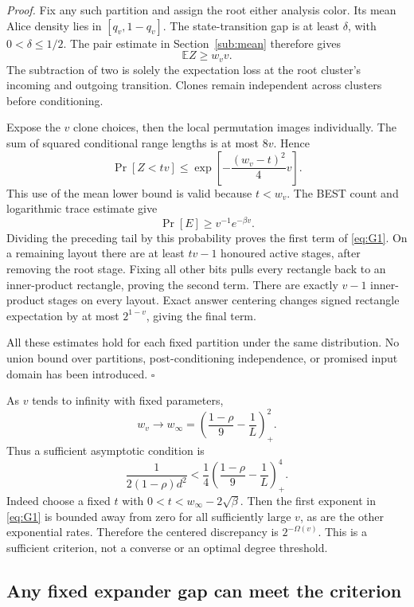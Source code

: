 \documentclass[11pt]{article}
\theoremstyle{definition}
\theoremstyle{remark}
\numberwithin{equation}{section}
\begin{document}
\emph{Proof.} Fix any such partition and assign the root either
analysis color. Its mean Alice density lies in
\([q_v,1-q_v]\). The state-transition gap is at least
\(\delta\), with \(0<\delta\le1/2\). The pair estimate in Section~\ref{sub:mean}
therefore gives
\[
                         \mathbb E Z\ge w_v v.
\]
The subtraction of two is solely the expectation loss at
the root cluster's incoming and outgoing transition.
Clones remain independent across clusters before conditioning.

Expose the \(v\) clone choices, then the local permutation
images individually. The sum of squared conditional range
lengths is at most \(8v\). Hence
\[
 \Pr[Z<tv]\le
       \exp\!\left[-\frac{(w_v-t)^2}{4}v\right].
\]
This use of the mean lower bound is valid because \(t<w_v\).
The BEST count and logarithmic trace estimate give
\[
                   \Pr[E]\ge v^{-1}e^{-\beta v}.
\]
Dividing the preceding tail by this probability proves
the first term of \eqref{eq:G1}. On a remaining layout there are
at least \(tv-1\) honoured active stages, after removing
the root stage. Fixing all other bits pulls every rectangle
back to an inner-product rectangle, proving the second term.
There are exactly \(v-1\) inner-product stages on every
layout. Exact answer centering changes signed rectangle
expectation by at most \(2^{1-v}\), giving the final term.

All these estimates hold for each fixed partition under
the same distribution. No union bound over partitions,
post-conditioning independence, or promised input domain
has been introduced. \(\square\)

As \(v\) tends to infinity with fixed parameters,
\[
            w_v\longrightarrow
            w_\infty=
             \left(\frac{1-\rho}{9}-\frac1L\right)_+^2.
\]
Thus a sufficient asymptotic condition is
\begin{equation}\label{eq:G2}
\boxed{\qquad
       \frac1{2(1-\rho)d^2}
         <\frac14
            \left(\frac{1-\rho}{9}-\frac1L\right)_+^4 .
       \qquad}
\end{equation}
Indeed choose a fixed \(t\) with
\(0<t<w_\infty-2\sqrt\beta\). Then the first exponent
in \eqref{eq:G1} is bounded away from zero for all sufficiently
large \(v\), as are the other exponential rates. Therefore
the centered discrepancy is \(2^{-\Omega(v)}\).
This is a sufficient criterion, not a converse or an optimal
degree threshold.

\subsection{Any fixed expander gap can meet the criterion}
\end{document}
